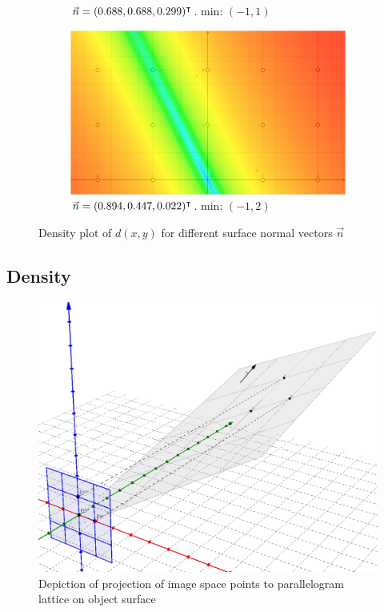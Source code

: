 \begin{figure}[h]
\begin{subfigure}{.49\textwidth}
	\caption{$\vec{n} = (0.688, 0.688, 0.299)^\intercal$. min: $(-1, 1)$}
\end{subfigure}%
\begin{subfigure}{.49\textwidth}
	\includegraphics[width=\linewidth]{fig/lmin/80-40-2.pdf}
	\caption{$\vec{n} = (0.894, 0.447, 0.022)^\intercal$. min: $(-1, 2)$}
\end{subfigure}
\caption{Density plot of $d(x, y)$ for different surface normal vectors $\vec{n}$}
\label{fig:lmin_d_func}
\end{figure}


\subsection{Density}


\begin{figure}[h]
\centering
\includegraphics[width=.9\textwidth]{fig/lattice_proof.png}
\caption{Depiction of projection of image space points to parallelogram lattice on object surface}
\label{fig:lattice_proof}
\end{figure}





